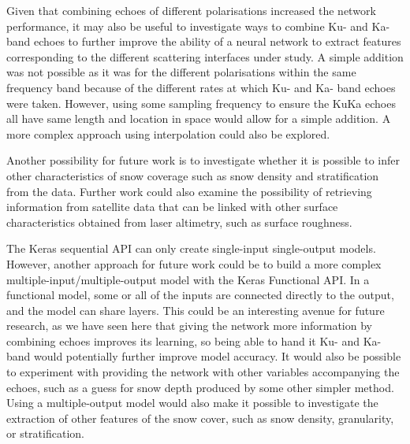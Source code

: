 \documentclass[11pt, a4paper]{article}
\begin{document}
Given that combining echoes of different polarisations increased the network performance, it may also be useful to
investigate ways to combine Ku- and Ka-band echoes to further improve the ability of a neural network to extract features corresponding to the different scattering interfaces under study.  A simple addition was not possible as it was for the different polarisations within the same frequency band because of the different rates at which Ku- and Ka- band echoes were taken.  However,  using some sampling frequency to ensure the KuKa echoes all have same length and location in space would allow for a simple addition. A more complex approach using interpolation could also be explored.

Another possibility for future work is to investigate whether it is possible to infer other characteristics of snow coverage such as snow density and stratification from the data.  Further work could also examine the possibility of retrieving information from satellite data that can be linked with other surface characteristics obtained from laser altimetry,  such as surface roughness.

The Keras sequential API can only create single-input single-output models.  However, another approach for future work could be to build a more complex multiple-input/multiple-output model with the Keras Functional API.  In a functional model, some or all of the inputs are connected directly to the output, and the model can share layers.  This could be an interesting avenue for future research, as we have seen here that giving the network more information by combining echoes improves its learning, so being able to hand it Ku- and Ka-band would potentially further improve model accuracy.  It would also be possible to experiment with providing the network with other variables accompanying the echoes,  such as a guess for snow depth produced by some other simpler method. Using a multiple-output model would also make it possible to investigate the extraction of other features of the snow cover, such as snow density,  granularity, or stratification.
\end{document}
